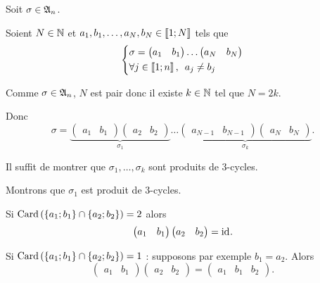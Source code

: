 \begin{corr}[4]
Soit \(\sigma\in\frak{A}_{n}\).

Soient \(N\in\mathbb{N}\) et \(a_1,b_1,\dots,a_N,b_N\in\left\llbracket1;N\right\rrbracket\) tels que \[\begin{dcases}\sigma=\begin{pmatrix}a_1 & b_1\end{pmatrix}\dots\begin{pmatrix}a_N & b_N\end{pmatrix} \\ \quantifs{\forall j\in\interventierii{1}{n}}a_j\not=b_j\end{dcases}\]

Comme \(\sigma\in\frak{A}_{n}\), \(N\) est pair donc il existe \(k\in\mathbb{N}\) tel que \(N=2k\).

Donc \[\sigma=\underbrace{\begin{pmatrix}a_1 & b_1\end{pmatrix}\begin{pmatrix}a_2 & b_2\end{pmatrix}}_{\sigma_1}\dots\underbrace{\begin{pmatrix}a_{N-1} & b_{N-1}\end{pmatrix}\begin{pmatrix}a_N & b_N\end{pmatrix}}_{\sigma_k}.\]

Il suffit de montrer que \(\sigma_1,\dots,\sigma_k\) sont produits de \(3\)-cycles.

Montrons que \(\sigma_1\) est produit de \(3\)-cycles.

Si \(\operatorname{Card}\left(\left\lbrace a_1;b_1\right\rbrace\cap\left\lbrace a_2;b_2\right\rbrace\right)=2\) alors \[\begin{pmatrix}a_1 & b_1\end{pmatrix}\begin{pmatrix}a_2 & b_2\end{pmatrix}=\mathrm{id}_{}.\]

Si \(\operatorname{Card}\left(\left\lbrace a_1;b_1\right\rbrace\cap\left\lbrace a_2;b_2\right\rbrace\right)=1\) : supposons par exemple \(b_1=a_2\). Alors \[\begin{pmatrix}a_1 & b_1\end{pmatrix}\begin{pmatrix}a_2 & b_2\end{pmatrix}=\begin{pmatrix}a_1 & b_1 & b_2\end{pmatrix}.\]


\end{corr}

